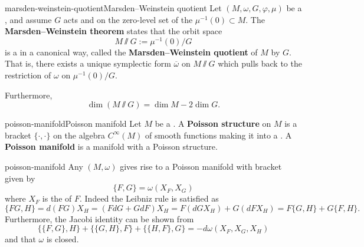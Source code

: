 \begin{topic}{marsden-weinstein-quotient}{Marsden--Weinstein quotient}
    Let $(M, \omega, G, \varphi, \mu)$ be a , and assume $G$ acts  and  on the zero-level set of the  $\mu^{-1}(0) \subset M$. The \textbf{Marsden--Weinstein theorem} states that the orbit space
    \[ M \sslash G := \mu^{-1}(0) / G \]
    is a  in a canonical way, called the \textbf{Marsden--Weinstein quotient} of $M$ by $G$. That is, there exists a unique symplectic form $\overline{\omega}$ on $M \sslash G$ which pulls back to the restriction of $\omega$ on $\mu^{-1}(0) / G$.
    
    Furthermore,
    \[ \dim(M \sslash G) = \dim M - 2 \dim G . \]
\end{topic}

\begin{topic}{poisson-manifold}{Poisson manifold}
    Let $M$ be a . A \textbf{Poisson structure} on $M$ is a bracket $\{ \cdot, \cdot \}$ on the algebra $C^\infty(M)$ of smooth functions making it into a . A \textbf{Poisson manifold} is a manifold with a Poisson structure.
\end{topic}

\begin{example}{poisson-manifold}
    Any  $(M, \omega)$ gives rise to a Poisson manifold with bracket given by
    \[ \{ F, G \} = \omega(X_F, X_G) \]
    where $X_F$ is the  of $F$.
    Indeed the Leibniz rule is satisfied as
    \[ \{ FG, H \} = d(FG) X_H = (F d G + G d F) X_H = F (d G X_H) + G (d F X_H) = F \{ G, H \} + G \{ F, H \} . \]
    Furthermore, the Jacobi identity can be shown from
    \[ \{ \{ F, G \}, H \} + \{ \{ G, H \}, F \} + \{ \{ H, F \}, G \} = -d \omega(X_F, X_G, X_H) \]
    and that $\omega$ is closed.
\end{example}
